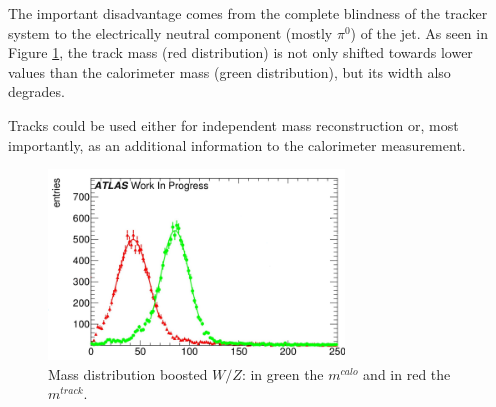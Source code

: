 
The important disadvantage comes from the complete blindness of the tracker system to the 
 electrically neutral component (mostly $\pi^0$) of the jet. As seen in Figure \ref{fig:trackandcalo}, the track mass (red distribution) is not only shifted towards lower values than the calorimeter mass (green distribution), but its width also degrades. 

Tracks could be used either for independent mass reconstruction or, most importantly, as an additional information to the calorimeter measurement.

\begin{figure}[!ht]
  \centering
      \includegraphics[width=0.7\textwidth]{jet_part/trackandcalo.png}
  \caption[Mass distribution for boosted $W/Z$]{Mass distribution boosted $W/Z$: in green the $m^{calo}$ and in red the $m^{track}$. }
  \label{fig:trackandcalo}
\end{figure}


